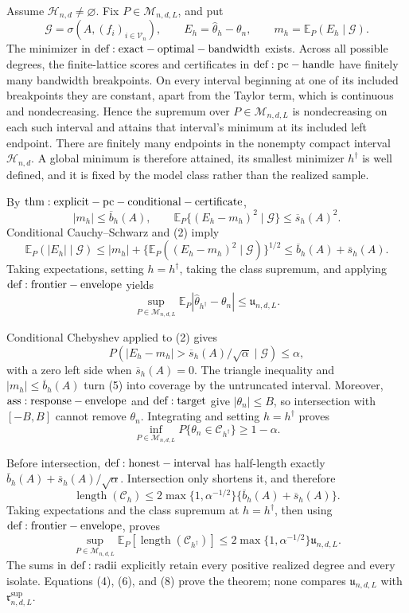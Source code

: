Assume \(\mathcal H_{n,d}\ne\varnothing\).  Fix \(P\in\mathcal M_{n,d,L}\), and put
\[
 \mathcal G=\sigma\!\left(A,(f_i)_{i\in\mathcal V_n}\right),
 \qquad E_h=\widehat\theta_h-\theta_n,
 \qquad m_h=\mathbb E_P(E_h\mid\mathcal G).
\tag{1}
\]
The minimizer in \({\rm def:exact-optimal-bandwidth}\) exists.  Across all possible degrees, the finite-lattice scores and certificates in \({\rm def:pc-handle}\) have finitely many bandwidth breakpoints.  On every interval beginning at one of its included breakpoints they are constant, apart from the Taylor term, which is continuous and nondecreasing.  Hence the supremum over \(P\in\mathcal M_{n,d,L}\) is nondecreasing on each such interval and attains that interval's minimum at its included left endpoint.  There are finitely many endpoints in the nonempty compact interval \(\mathcal H_{n,d}\).  A global minimum is therefore attained, its smallest minimizer \(h^\dagger\) is well defined, and it is fixed by the model class rather than the realized sample.

By \({\rm thm:explicit-pc-conditional-certificate}\),
\[
 |m_h|\leq\overline b_h(A),
 \qquad
 \mathbb E_P\{(E_h-m_h)^2\mid\mathcal G\}\leq\overline s_h(A)^2.
\tag{2}
\]
Conditional Cauchy--Schwarz and (2) imply
\[
 \mathbb E_P(|E_h|\mid\mathcal G)
 \leq |m_h|+\{\mathbb E_P((E_h-m_h)^2\mid\mathcal G)\}^{1/2}
 \leq\overline b_h(A)+\overline s_h(A).
\tag{3}
\]
Taking expectations, setting \(h=h^\dagger\), taking the class supremum, and applying \({\rm def:frontier-envelope}\) yields
\[
 \sup_{P\in\mathcal M_{n,d,L}}
 \mathbb E_P|\widehat\theta_{h^\dagger}-\theta_n|
 \leq\mathfrak u_{n,d,L}.
\tag{4}
\]

Conditional Chebyshev applied to (2) gives
\[
 P\!\left(|E_h-m_h|>\overline s_h(A)/\sqrt\alpha\mid\mathcal G\right)\leq\alpha,
\tag{5}
\]
with a zero left side when \(\overline s_h(A)=0\).  The triangle inequality and \(|m_h|\leq\overline b_h(A)\) turn (5) into coverage by the untruncated interval.  Moreover, \({\rm ass:response-envelope}\) and \({\rm def:target}\) give \(|\theta_n|\leq B\), so intersection with \([-B,B]\) cannot remove \(\theta_n\).  Integrating and setting \(h=h^\dagger\) proves
\[
 \inf_{P\in\mathcal M_{n,d,L}}P\{\theta_n\in\mathcal C_{h^\dagger}\}\geq1-\alpha.
\tag{6}
\]

Before intersection, \({\rm def:honest-interval}\) has half-length exactly \(\overline b_h(A)+\overline s_h(A)/\sqrt\alpha\).  Intersection only shortens it, and therefore
\[
 \operatorname{length}(\mathcal C_h)
 \leq2\max\{1,\alpha^{-1/2}\}\{\overline b_h(A)+\overline s_h(A)\}.
\tag{7}
\]
Taking expectations and the class supremum at \(h=h^\dagger\), then using \({\rm def:frontier-envelope}\), proves
\[
 \sup_{P\in\mathcal M_{n,d,L}}
 \mathbb E_P[\operatorname{length}(\mathcal C_{h^\dagger})]
 \leq2\max\{1,\alpha^{-1/2}\}\mathfrak u_{n,d,L}.
\tag{8}
\]
The sums in \({\rm def:radii}\) explicitly retain every positive realized degree and every isolate.  Equations (4), (6), and (8) prove the theorem; none compares \(\mathfrak u_{n,d,L}\) with \(\mathfrak r^{\mathrm{sup}}_{n,d,L}\).